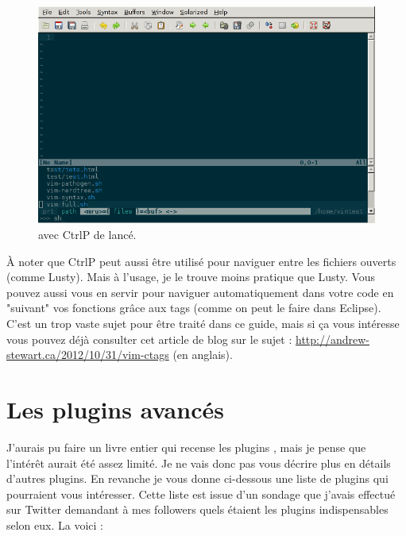 \begin{figure}
  \includegraphics[width=\linewidth]{graphics/vim-ctrlp.png}
  \caption{\vim avec CtrlP de lancé.}
  \label{fig:vim-ctrlp}
\end{figure}

À noter que CtrlP peut aussi être utilisé pour naviguer entre les fichiers ouverts (comme Lusty). Mais à l'usage, je le trouve moins pratique que Lusty. Vous pouvez aussi vous en servir pour naviguer automatiquement dans votre code en "suivant" vos fonctions grâce aux tags (comme on peut le faire dans Eclipse). C'est un trop vaste sujet pour être traité dans ce guide, mais si ça vous intéresse vous pouvez déjà consulter cet article de blog sur le sujet : \url{http://andrew-stewart.ca/2012/10/31/vim-ctags} (en anglais).

\section{Les plugins avancés}

J'aurais pu faire un livre entier qui recense les plugins \vim, mais je pense que l'intérêt aurait été assez limité. Je ne vais donc pas vous décrire plus en détails d'autres plugins. En revanche je vous donne ci-dessous une liste de plugins qui pourraient vous intéresser. Cette liste est issue d'un sondage que j'avais effectué sur Twitter demandant à mes followers quels étaient les plugins \vim indispensables selon eux. La voici :



